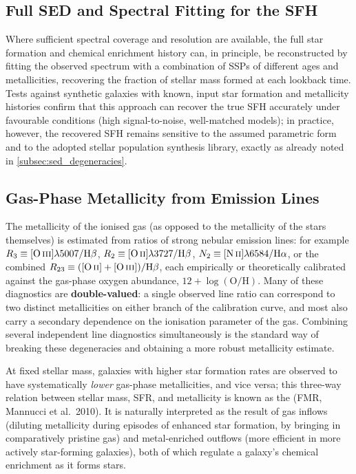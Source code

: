 \subsection{Full SED and Spectral Fitting for the SFH} \label{subsec:sed_sfh_reconstruction}

Where sufficient spectral coverage and resolution are available, the full star formation and chemical enrichment history can, in principle, be reconstructed by fitting the observed spectrum with a combination of SSPs of different ages and metallicities, recovering the fraction of stellar mass formed at each lookback time. Tests against synthetic galaxies with known, input star formation and metallicity histories confirm that this approach can recover the true SFH accurately under favourable conditions (high signal-to-noise, well-matched models); in practice, however, the recovered SFH remains sensitive to the assumed parametric form and to the adopted stellar population synthesis library, exactly as already noted in \cref{subsec:sed_degeneracies}.

\subsection{Gas-Phase Metallicity from Emission Lines} \label{subsec:gas_metallicity}

The metallicity of the ionised gas (as opposed to the metallicity of the stars themselves) is estimated from ratios of strong nebular emission lines: for example $R_3 \equiv [\text{O\,\textsc{iii}}]\lambda5007/\text{H}\beta$, $R_2 \equiv [\text{O\,\textsc{ii}}]\lambda3727/\text{H}\beta$, $N_2 \equiv [\text{N\,\textsc{ii}}]\lambda6584/\text{H}\alpha$, or the combined $R_{23} \equiv ([\text{O\,\textsc{ii}}]+[\text{O\,\textsc{iii}}])/\text{H}\beta$, each empirically or theoretically calibrated against the gas-phase oxygen abundance, $12+\log(\text{O/H})$. Many of these diagnostics are \textbf{double-valued}: a single observed line ratio can correspond to two distinct metallicities on either branch of the calibration curve, and most also carry a secondary dependence on the ionisation parameter of the gas. Combining several independent line diagnostics simultaneously is the standard way of breaking these degeneracies and obtaining a more robust metallicity estimate.

\begin{exampleblock}
At fixed stellar mass, galaxies with higher star formation rates are observed to have systematically \emph{lower} gas-phase metallicities, and vice versa; this three-way relation between stellar mass, SFR, and metallicity is known as the  (FMR, Mannucci et al.\ 2010). It is naturally interpreted as the result of gas inflows (diluting metallicity during episodes of enhanced star formation, by bringing in comparatively pristine gas) and metal-enriched outflows (more efficient in more actively star-forming galaxies), both of which regulate a galaxy's chemical enrichment as it forms stars.
\end{exampleblock}

